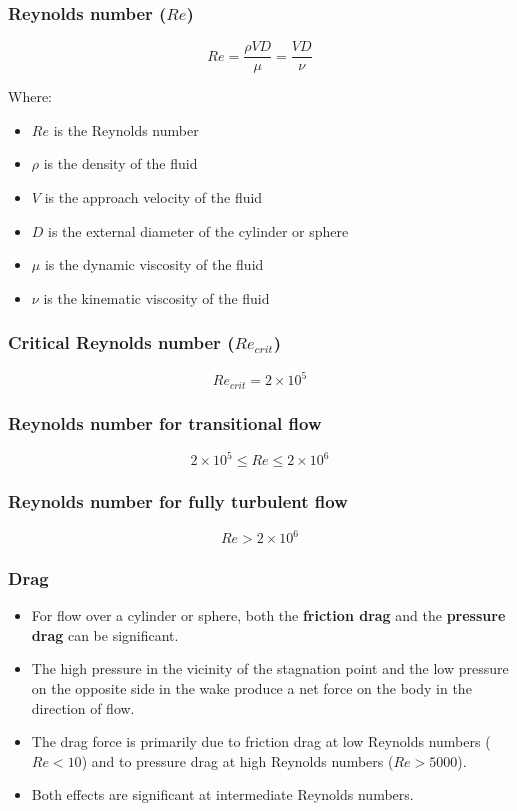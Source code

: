 \documentclass[11pt]{article}
\begin{document}
\subsubsection{Reynolds number (\(Re\))}
\label{sec:org0be9ffc}
\[Re = \frac{\rho V D}{\mu} = \frac{VD}{\nu}\]

Where:
\begin{itemize}
\item \(Re\) is the Reynolds number
\item \(\rho\) is the density of the fluid
\item \(V\) is the approach velocity of the fluid
\item \(D\) is the external diameter of the cylinder or sphere
\item \(\mu\) is the dynamic viscosity of the fluid
\item \(\nu\) is the kinematic viscosity of the fluid
\end{itemize}

\subsubsection{Critical Reynolds number (\(Re_{crit}\))}
\label{sec:org6738191}
\[Re_{crit} = 2 \times 10^5\]

\subsubsection{Reynolds number for transitional flow}
\label{sec:org9441e79}
\[2 \times 10^5 \le Re \le 2 \times 10 ^6\]

\subsubsection{Reynolds number for fully turbulent flow}
\label{sec:orgc4947b1}
\[Re > 2 \times 10^6\]

\subsubsection{Drag}
\label{sec:org0c9a1fa}
\begin{itemize}
\item For flow over a cylinder or sphere, both the \textbf{friction drag} and the \textbf{pressure drag} can be significant.
\item The high pressure in the vicinity of the stagnation point and the low pressure on the opposite side in the wake produce a net force on the body in the direction of flow.
\item The drag force is primarily due to friction drag at low Reynolds numbers (\(Re < 10\)) and to pressure drag at high Reynolds numbers (\(Re > 5000\)).
\item Both effects are significant at intermediate Reynolds numbers.
\end{itemize}
\end{document}
